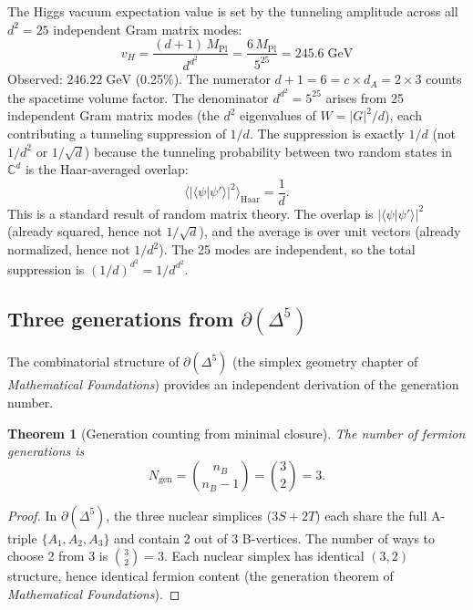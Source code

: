 \documentclass[12pt]{article}
\newtheorem{theorem}{Theorem}[section]
\theoremstyle{remark}
\theoremstyle{definition}
\newcommand{\CC}{\mathbb{C}}
\begin{document}
The Higgs vacuum expectation value is set by the tunneling amplitude across all $d^2 = 25$ independent Gram matrix modes:
\begin{equation}
\boxed{v_H = \frac{(d+1)\,M_\text{Pl}}{d^{d^2}} = \frac{6\,M_\text{Pl}}{5^{25}} = 245.6\;\text{GeV}}
\end{equation}
Observed: $246.22\;\text{GeV}$ (0.25\%). The numerator $d + 1 = 6 = c \times d_A = 2 \times 3$ counts the spacetime volume factor. The denominator $d^{d^2} = 5^{25}$ arises from 25 independent Gram matrix modes (the $d^2$ eigenvalues of $W = |G|^2/d$), each contributing a tunneling suppression of $1/d$. The suppression is exactly $1/d$ (not $1/d^2$ or $1/\sqrt{d}$) because the tunneling probability between two random states in $\CC^d$ is the Haar-averaged overlap:
\begin{equation}
\langle|\langle\psi|\psi'\rangle|^2\rangle_\text{Haar} = \frac{1}{d}.
\end{equation}
This is a standard result of random matrix theory. The overlap is $|\langle\psi|\psi'\rangle|^2$ (already squared, hence not $1/\sqrt{d}$), and the average is over unit vectors (already normalized, hence not $1/d^2$). The 25 modes are independent, so the total suppression is $(1/d)^{d^2} = 1/d^{d^2}$.

\subsection{Three generations from $\partial(\Delta^5)$}
\label{sec:three_gen}

The combinatorial structure of $\partial(\Delta^5)$ (the simplex geometry chapter of \textit{Mathematical Foundations}) provides an independent derivation of the generation number.

\begin{theorem}[Generation counting from minimal closure]
\label{thm:gen_count}
The number of fermion generations is
\begin{equation}
N_\mathrm{gen} = \binom{n_B}{n_B - 1} = \binom{3}{2} = 3.
\end{equation}
\end{theorem}

\begin{proof}
In $\partial(\Delta^5)$, the three nuclear simplices ($3S + 2T$) each share the full A-triple $\{A_1, A_2, A_3\}$ and contain 2 out of 3 B-vertices. The number of ways to choose 2 from 3 is $\binom{3}{2} = 3$.  Each nuclear simplex has identical $(3,2)$ structure, hence identical fermion content (the generation theorem of \textit{Mathematical Foundations}).
\end{proof}
\end{document}
